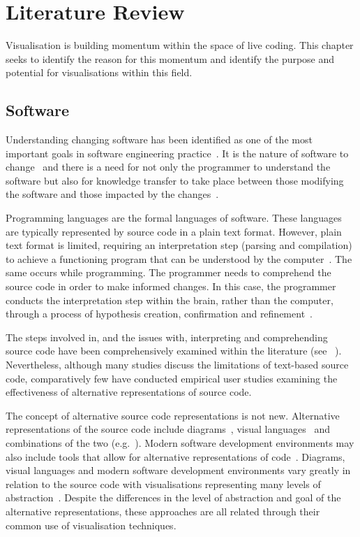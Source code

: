 
\chapter{Literature Review}
\label{chap:literature-review}

Visualisation is building momentum within the space of live coding. This chapter seeks to identify the reason for this momentum and identify the purpose and potential for visualisations within this field.

\section{Software}

Understanding changing software has been identified as one of the most important goals in software engineering practice~\cite{Tao2012}. It is the nature of software to change~\cite{Brooks1995} and there is a need for not only the programmer to understand the software but also for knowledge transfer to take place between those modifying the software and those impacted by the changes~\cite{Tao2012}.

Programming languages are the formal languages of software. These languages are typically represented by source code in a plain text format. However, plain text format is limited, requiring an interpretation step (parsing and compilation) to achieve a functioning program that can be understood by the computer~\cite{Badros2000}. The same occurs while programming. The programmer needs to comprehend the source code in order to make informed changes. In this case, the programmer conducts the interpretation step within the brain, rather than the computer, through a process of hypothesis creation, confirmation and refinement~\cite{Brooks1983}.

The steps involved in, and the issues with, interpreting and comprehending source code have been comprehensively examined within the literature (see ~\cite{Novais2013,McLean2010a,Brooks1995,Desmond,Rajlich2002}). Nevertheless, although many studies discuss the limitations of text-based source code, comparatively few have conducted empirical user studies examining the effectiveness of alternative representations of source code.

The concept of alternative source code representations is not new. Alternative representations of the source code include diagrams~\cite{Rumbaugh2004}, visual languages~\cite{Cox2007} and combinations of the two (e.g.~\cite{Lucanin2011}). Modern software development environments may also include tools that allow for alternative representations of code~\cite{Cox2007}. Diagrams, visual languages and modern software development environments vary greatly in relation to the source code with visualisations representing many levels of abstraction~\cite{Jerding1997}. Despite the differences in the level of abstraction and goal of the alternative representations, these approaches are all related through their common use of visualisation techniques.

